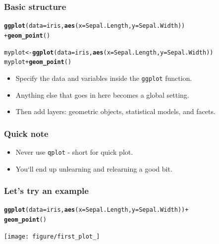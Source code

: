 \documentclass{beamer}\usepackage[]{graphicx}\usepackage[]{color}
\makeatletter
\newcommand{\hlopt}[1]{\textcolor[rgb]{0,0,0}{#1}}%
\newcommand{\hlstd}[1]{\textcolor[rgb]{0.345,0.345,0.345}{#1}}%
\newcommand{\hlkwb}[1]{\textcolor[rgb]{0.69,0.353,0.396}{#1}}%
\newcommand{\hlkwc}[1]{\textcolor[rgb]{0.333,0.667,0.333}{#1}}%
\newcommand{\hlkwd}[1]{\textcolor[rgb]{0.737,0.353,0.396}{\textbf{#1}}}%
\newenvironment{kframe}{%
 \def\at@end@of@kframe{}%
 \ifinner\ifhmode%
  \def\at@end@of@kframe{\end{minipage}}%
  \begin{minipage}{\columnwidth}%
 \fi\fi%
 \def\FrameCommand##1{\hskip\@totalleftmargin \hskip-\fboxsep
 \colorbox{shadecolor}{##1}\hskip-\fboxsep
     \hskip-\linewidth \hskip-\@totalleftmargin \hskip\columnwidth}%
 \MakeFramed {\advance\hsize-\width
   \@totalleftmargin\z@ \linewidth\hsize
   \@setminipage}}%
 {\par\unskip\endMakeFramed%
 \at@end@of@kframe}
\newenvironment{knitrout}{}{} %
\makeatother
\begin{document}
\begin{frame}[fragile]
\frametitle{Basic structure}
\begin{knitrout}\footnotesize
{}\color{fgcolor}\begin{kframe}
\begin{alltt}
\hlkwd{ggplot}\hlstd{(}\hlkwc{data} \hlstd{= iris,} \hlkwd{aes}\hlstd{(}\hlkwc{x} \hlstd{= Sepal.Length,} \hlkwc{y} \hlstd{= Sepal.Width))}
 \hlopt{+} \hlkwd{geom_point}\hlstd{()}

\hlstd{myplot} \hlkwb{<-} \hlkwd{ggplot}\hlstd{(}\hlkwc{data} \hlstd{= iris,} \hlkwd{aes}\hlstd{(}\hlkwc{x} \hlstd{= Sepal.Length,} \hlkwc{y} \hlstd{= Sepal.Width))}
\hlstd{myplot} \hlopt{+} \hlkwd{geom_point}\hlstd{()}
\end{alltt}
\end{kframe}
\end{knitrout}
\begin{itemize}
\item Specify the data and variables inside the \texttt{ggplot} function.
\item Anything else that goes in here becomes a global setting.
\item Then add layers: geometric objects, statistical models, and facets.
\end{itemize}
\end{frame}


\begin{frame}[fragile]
\frametitle{Quick note}
\begin{itemize}
\item Never use \texttt{qplot} - short for quick plot.
\item You`ll end up unlearning and relearning a good bit.
\end{itemize}

\end{frame}


\begin{frame}[fragile]
\frametitle{Let's try an example}
\begin{knitrout}\footnotesize
{}\color{fgcolor}\begin{kframe}
\begin{alltt}
\hlkwd{ggplot}\hlstd{(}\hlkwc{data} \hlstd{= iris,} \hlkwd{aes}\hlstd{(}\hlkwc{x} \hlstd{= Sepal.Length,} \hlkwc{y} \hlstd{= Sepal.Width))} \hlopt{+}
\hlkwd{geom_point}\hlstd{()}
\end{alltt}
\end{kframe}

{\centering \texttt{[image: figure/first\_plot\_]} 

}



\end{knitrout}
\end{frame}
\end{document}
